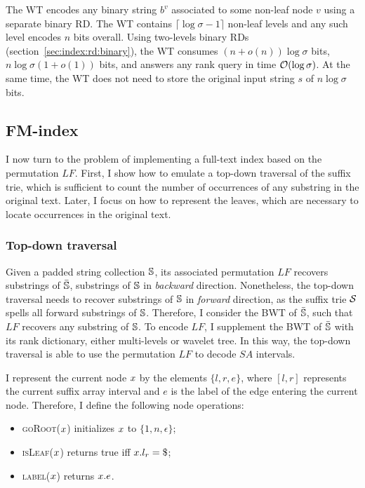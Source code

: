 The WT encodes any binary string $b^v$ associated to some non-leaf node $v$ using a separate binary RD.
The WT contains $\lceil \log \sigma - 1 \rceil$ non-leaf levels and any such level encodes $n$ bits overall.
Using two-levels binary RDs (section~\ref{sec:index:rd:binary}), the WT consumes $(n + o(n)) \log \sigma$ bits, \ie $n \log \sigma (1 + o(1))$ bits, and answers any rank query in time $\mathcal{O}(\log{\sigma})$.
At the same time, the WT does not need to store the original input string $s$ of $n \log \sigma$ bits.

\subsection{FM-index}
\label{sub:fmtrie}

I now turn to the problem of implementing a full-text index based on the permutation $LF$.
First, I show how to emulate a top-down traversal of the suffix trie, which is sufficient to count the number of occurrences of any substring in the original text.
Later, I focus on how to represent the leaves, which are necessary to locate occurrences in the original text.

\subsubsection{Top-down traversal}

Given a padded string collection $\mathbb {S}$, its associated permutation $LF$ recovers substrings of $\bar{\mathbb {S}}$, \ie substrings of $\mathbb {S}$ in \emph{backward} direction.
Nonetheless, the top-down traversal needs to recover substrings of $\mathbb {S}$ in \emph{forward} direction, as the suffix trie $\mathcal {S}$ spells all forward substrings of $\mathbb {S}$.
Therefore, I consider the BWT of $\bar{\mathbb {S}}$, such that $LF$ recovers any substring of $\mathbb {S}$.
To encode $LF$, I supplement the BWT of $\bar{\mathbb {S}}$ with its rank dictionary, either multi-levels or wavelet tree.
In this way, the top-down traversal is able to use the permutation $LF$ to decode $SA$ intervals.

I represent the current node $x$ by the elements $\{ l, r, e \}$, where $[l,r]$ represents the current suffix array interval and $e$ is the label of the edge entering the current node.
Therefore, I define the following node operations:
\begin{itemize}
\item \textsc{goRoot}($x$) initializes $x$ to $\{ 1, n, \epsilon \}$;
\item \textsc{isLeaf}($x$) returns true iff $\Tn.l_r = \$$;
\item \textsc{label}($x$) returns $x.e$.
\end{itemize}

